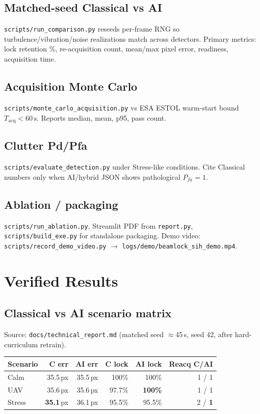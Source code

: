 \documentclass[11pt,a4paper]{article}
\begin{document}
\subsection{Matched-seed Classical vs AI}
\texttt{scripts/run\_comparison.py} reseeds per-frame RNG so turbulence/vibration/noise realizations match across detectors.
Primary metrics: lock retention \%, re-acquisition count, mean/max pixel error, readiness, acquisition time.

\subsection{Acquisition Monte Carlo}
\texttt{scripts/monte\_carlo\_acquisition.py} vs ESA ESTOL warm-start bound $T_{\mathrm{acq}}<60\,\mathrm{s}$.
Reports median, mean, p95, pass count.

\subsection{Clutter Pd/Pfa}
\texttt{scripts/evaluate\_detection.py} under Stress-like conditions.
Cite Classical numbers only when AI/hybrid JSON shows pathological $P_{fa}=1$.

\subsection{Ablation / packaging}
\texttt{scripts/run\_ablation.py}, Streamlit PDF from \texttt{report.py}, \texttt{scripts/build\_exe.py} for standalone packaging.
Demo video: \texttt{scripts/record\_demo\_video.py} $\rightarrow$ \texttt{logs/demo/beamlock\_sih\_demo.mp4}.

\section{Verified Results}

\subsection{Classical vs AI scenario matrix}
Source: \texttt{docs/technical\_report.md} (matched seed $\approx$45\,s, seed 42, after hard-curriculum retrain).

\begin{center}
\begin{tabular}{@{}lrrrrr@{}}
\toprule
Scenario & C err & AI err & C lock & AI lock & Reacq C/AI \\
\midrule
Calm & 35.5\,px & 35.5\,px & 100\% & 100\% & 1 / 1 \\
UAV & 35.6\,px & 35.6\,px & 97.7\% & \textbf{100\%} & 1 / 1 \\
Stress & \textbf{35.1}\,px & 36.1\,px & 95.5\% & 95.5\% & 2 / \textbf{1} \\
\bottomrule
\end{tabular}
\end{center}
\end{document}
